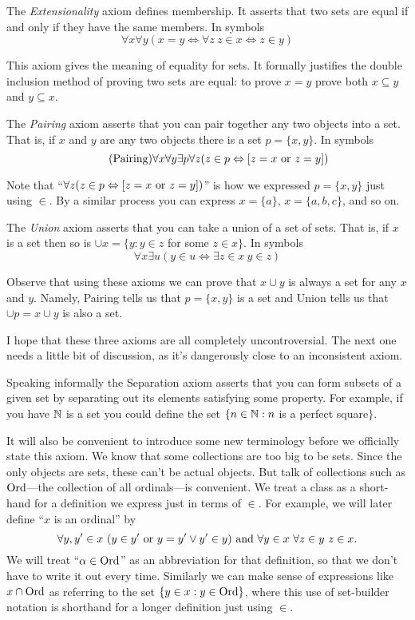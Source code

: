 \documentclass[10pt]{amsart}
\begin{document}
\begin{definition}
The \emph{Extensionality} axiom defines membership. It asserts that two sets are equal if and only if they have the same members. In symbols
\[
\tag{Extensionality}
\forall x \forall y (x = y \iff \forall z\ z \in x \iff z \in y)
\]
\end{definition}

This axiom gives the meaning of equality for sets. It formally justifies the double inclusion method of proving two sets are equal: to prove $x = y$ prove both $x \subseteq y$ and $y \subseteq x$.

\begin{definition}
The \emph{Pairing} axiom asserts that you can pair together any two objects into a set. That is, if $x$ and $y$ are any two objects there is a set $p = \{x,y\}$. In symbols
\[
\tag{Pairing}
\forall x \forall y \exists p \forall z (z \in p \Leftrightarrow [z = x \textrm{ or } z = y])
\]
\end{definition}

Note that ``$\forall z (z \in p \Leftrightarrow [z = x \textrm{ or } z = y])$'' is how we expressed $p = \{x,y\}$ just using $\in$. By a similar process you can express $x = \{a\}$, $x = \{a,b,c\}$, and so on.

\begin{definition}
The \emph{Union} axiom asserts that you can take a union of a set of sets. That is, if $x$ is a set then so is $\cup x = \{ y : y \in z$ for some $z \in x\}$. In symbols
\[
\tag{Union}
\forall x \exists u (y \in u \iff \exists z \in x\ y \in z)
\]
\end{definition}

Observe that using these axioms we can prove that $x \cup y$ is always a set for any $x$ and $y$. Namely, Pairing tells us that $p = \{x,y\}$ is a set and Union tells us that $\cup p = x \cup y$ is also a set.
\smallskip

I hope that these three axioms are all completely uncontroversial. The next one needs a little bit of discussion, as it's dangerously close to an inconsistent axiom.

Speaking informally the Separation axiom asserts that you can form subsets of a given set by separating out its elements satisfying some property. For example, if you have $\mathbb{N}$ is a set you could define the set $\{ n \in \mathbb{N} : n$ is a perfect square$\}$. 

It will also be convenient to introduce some new terminology before we officially state this axiom. We know that some collections are too big to be sets. Since the only objects are sets, these can't be actual objects. But talk of collections such as $\mathrm{Ord}$---the collection of all ordinals---is convenient. We treat a class as a short-hand for a definition we express just in terms of $\in$. For example, we will later define ``$x$ is an ordinal'' by
\[
\forall y,y' \in x\ (y \in y' \textrm{ or } y = y' \lor y' \in y) \textrm{ and } \forall y \in x\ \forall z \in y\ z \in x.
\]
We will treat ``$\alpha \in \mathrm{Ord}$'' as an abbreviation for that definition, so that we don't have to write it out every time. Similarly we can make sense of expressions like $x \cap \mathrm{Ord}$ as referring to the set $\{y \in x : y \in \mathrm{Ord}\}$, where this use of set-builder notation is shorthand for a longer definition just using $\in$.
\end{document}
